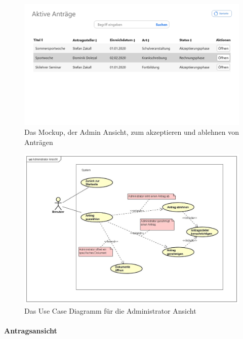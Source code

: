 \begin{figure}[H]
	\centering
	\includegraphics[width=1\linewidth]{images/Mockup-Admin}
	\caption[Mockup Adminansicht]{Das Mockup, der Admin Ansicht, zum akzeptieren und ablehnen von Anträgen}
	\label{fig:mockupAdmin}
\end{figure}
\begin{figure}[H]
	\centering
	\includegraphics[width=1\linewidth]{images/uc-admin}
	\caption[Use Case Diagramm Adminansicht]{Das Use Case Diagramm für die Administrator Ansicht}
	\label{fig:ucAdmin}
\end{figure}
\paragraph{Antragsansicht}
~\\

